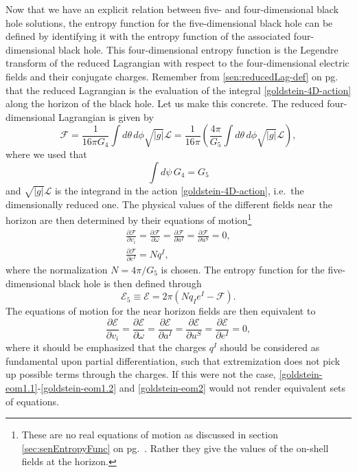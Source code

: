 \documentclass[12pt,twoside]{book}
\begin{document}
Now that we have an explicit relation between five- and four-dimensional black hole solutions, the entropy function for the five-dimensional black hole can be defined by identifying it with the entropy function of the associated four-dimensional black hole. This four-dimensional entropy function is the Legendre transform of the reduced Lagrangian with respect to the four-dimensional electric fields and their conjugate charges. Remember from \eqref{sen:reducedLag-def} on pg.\ \pageref{sen:reducedLag-def} that the reduced Lagrangian is the evaluation of the integral \eqref{goldstein-4D-action} along the horizon of the black hole. Let us make this concrete. The reduced four-dimensional Lagrangian is given by
\begin{equation}\label{GJ-defRL}
\mathcal{F}  = \frac{1}{16\pi G_{4}}\int d\theta\, d\phi \sqrt{|g|} \mathcal{L}
= \frac{1}{16\pi}\left(\frac{4\pi}{G_{5}}\int d\theta\, d\phi  \sqrt{|g|} \mathcal{L}\right),
\end{equation}
where we used that
\begin{equation}
\int d\psi \, G_{4} = G_{5}
\end{equation}
and $\sqrt{|g|} \mathcal{L}$ is the integrand in the action \eqref{goldstein-4D-action}, i.e.\ the dimensionally reduced one.
The physical values of the different fields near the horizon are then determined by their equations of motion\footnote{These are no real equations of motion as discussed in section \ref{sec:senEntropyFunc} on pg.\ \pageref{sec:senEntropyFunc}. Rather they give the values of the on-shell fields at the horizon.}
\begin{gather}\label{goldstein-eom1.1}
\frac{\partial \mathcal{F}}{\partial v_{i}} = \frac{\partial \mathcal{F}}{\partial \omega} = 
\frac{\partial \mathcal{F}}{\partial a^{I}} = \frac{\partial \mathcal{F}}{\partial u^{S}} =  0,\\
\label{goldstein-eom1.2}
\frac{\partial \mathcal{F}}{\partial e^{I}} = Nq^{I},
\end{gather}
where the normalization $N = 4\pi/ G_{5}$ is chosen. The entropy function for the five-dimensional black hole is then defined through
\begin{equation}\label{GJ-entrfuncDef}
\mathcal{E}_{5} \equiv \mathcal{E} = 2\pi(Nq_{I}e^{I} - \mathcal{F}).
\end{equation}
The equations of motion for the near horizon fields are then equivalent to
\begin{equation}\label{goldstein-eom2}
\frac{\partial \mathcal{E}}{\partial v_{i}} = \frac{\partial \mathcal{E}}{\partial \omega} = 
\frac{\partial \mathcal{E}}{\partial a^{I}} = \frac{\partial \mathcal{E}}{\partial u^{S}} = 
\frac{\partial \mathcal{E}}{\partial e^{I}} = 0,
\end{equation}
where it should be emphasized that the charges $q^{I}$ should be considered as fundamental upon partial differentiation, such that extremization does not pick up possible terms through the charges. If this were not the case, \eqref{goldstein-eom1.1}-\eqref{goldstein-eom1.2} and \eqref{goldstein-eom2} would not render equivalent sets of equations.\newline
\end{document}
